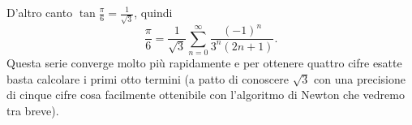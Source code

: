 \documentclass{amsart}
\numberwithin{equation}{section}
\begin{document}
D'altro canto $\tan \frac \pi 6=\frac 1{\sqrt 3}$, quindi
\[
\frac \pi 6=\frac 1{\sqrt 3}\sum_{n=0}^\infty \frac{(-1)^n}{3^n(2n+1)}.
\]
Questa serie converge molto pi\`u rapidamente e per ottenere quattro cifre esatte basta calcolare i primi otto termini (a patto di conoscere $\sqrt 3$ con una precisione di cinque cifre cosa facilmente ottenibile con l'algoritmo di Newton che vedremo tra breve).
\end{document}
